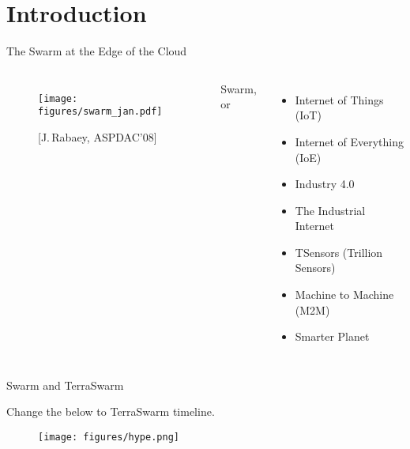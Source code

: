 \section{Introduction}

\begin{frame}{The Swarm at the Edge of the Cloud}
  \pause

  \begin{columns}
    \begin{figure}
      \texttt{[image: figures/swarm\_jan.pdf]}
      \captionsetup{labelformat=empty}
      \caption{[J.\,Rabaey, ASPDAC'08]}
    \end{figure}

    \pause

    Swarm, or
    \begin{itemize}
    \item Internet of Things (IoT)
    \item Internet of Everything (IoE)
    \item Industry 4.0
    \item The Industrial Internet
    \item TSensors (Trillion Sensors)
    \item Machine to Machine (M2M)
    \item Smarter Planet
    \end{itemize}
  \end{columns}
\end{frame}

\begin{frame}{Swarm and TerraSwarm}

  Change the below to TerraSwarm timeline.

\end{frame}

\begin{frame}
  \begin{figure}
    \texttt{[image: figures/hype.png]}
  \end{figure}
\end{frame}

